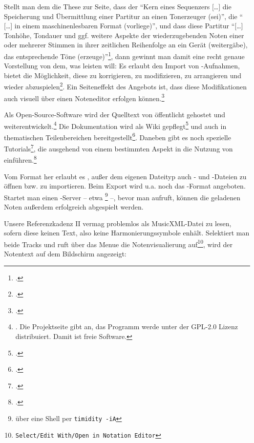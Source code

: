 Stellt man dem die These zur Seite, dass der \enquote{Kern eines Sequenzers
[\ldots] die Speicherung und Über\-mitt\-lung einer Partitur an einen
Tonerzeuger (sei)}, die \enquote{ [\ldots] in einem maschinenlesbaren Format
(vorliege)}, und dass diese Partitur \enquote{[\ldots] Tonhöhe, Tondauer und
ggf. weitere Aspekte der wiederzugebenden Noten einer oder mehrerer Stimmen in
ihrer zeitlichen Reihenfolge an ein Gerät (weitergäbe), das entsprechende Töne
(erzeuge)}\footcite[vgl.][\nopage wp.]{WpedSequencer2018a}, dann gewinnt man
damit eine recht genaue Vorstellung von dem, was  leisten will:
Es erlaubt den Import von -Aufnahmen, bietet die Möglichkeit, diese zu
korrigieren, zu modifizieren, zu arrangieren und wieder
abzuspielen\footcite[vgl.][\nopage wp.]{Rosegarden2019c}. Ein Seiteneffekt des
Angebots ist, dass diese Modifikationen auch visuell über einen Noteneditor
erfolgen können.\footcite[vgl.][\nopage wp.]{Rosegarden2019d}

Als Open-Source-Software wird der Quelltext von  öffentlicht
gehostet und weiterentwickelt.\footnote{\cite[vgl.][\nopage
wp.]{Rosegarden2019e}. Die Projektseite gibt an, das Programm werde unter der
GPL-2.0 Lizenz distribuiert. Damit ist  freie Software.} Die
Dokumentation wird als Wiki gepflegt\footcite[vgl.][\nopage wp.]{Rosegarden2019c}
und auch in thematischen Teilenbereichen bereitgestellt\footcite[vgl.][\nopage
wp.]{Rosegarden2019d}. Daneben gibt es noch spezielle
Tutorials\footcite[vgl.][\nopage wp.]{Rosegarden2019b}, die ausgehend von einem
bestimmten Aspekt in die Nutzung von 
einführen.\footcite[vgl.][\nopage wp.]{McIntyre2008a}

Vom Format her erlaubt es , außer dem eigenen Dateityp auch
- und -Dateien zu öffnen bzw. zu importieren. Beim Export
wird u.a. noch das -Format angeboten. Startet man einen
-Server -- etwa \footnote{über eine Shell per
\texttt{timidity -iA}} --, bevor man  aufruft, können die
geladenen Noten außerdem erfolgreich abgespielt werden.

Unsere Referenzkadenz II vermag  problemlos als MusicXML-Datei
zu lesen, sofern diese keinen Text, also keine Harmonierungssymbole enhält.
Selektiert man beide Tracks und ruft über das Menue die Notenvisualierung
auf\footnote{\texttt{Select/Edit With/Open in Notation Editor}}, wird der
Notentext auf dem Bildschirm angezeigt:

